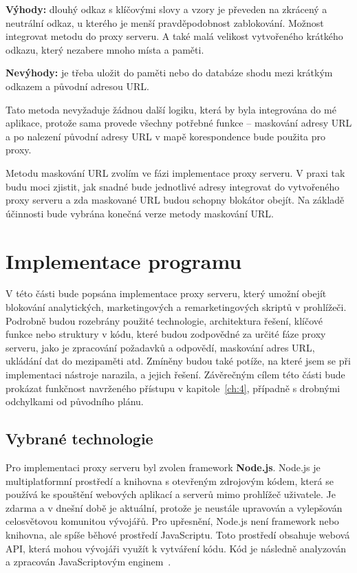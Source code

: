 \textbf{Výhody:} dlouhý odkaz s klíčovými slovy a vzory je převeden na zkrácený a neutrální odkaz, u kterého je menší pravděpodobnost zablokování. Možnost integrovat metodu do proxy serveru. A také malá velikost vytvořeného krátkého odkazu, který nezabere mnoho místa a paměti.

\textbf{Nevýhody:} je třeba uložit do paměti nebo do databáze shodu mezi krátkým odkazem a původní adresou URL.

Tato metoda nevyžaduje žádnou další logiku, která by byla integrována do mé aplikace, protože sama provede všechny potřebné funkce -- maskování adresy URL a po nalezení původní adresy URL v mapě korespondence bude použita pro proxy.
\bigskip

Metodu maskování URL zvolím ve fázi implementace proxy serveru. V praxi tak budu moci zjistit, jak snadné bude jednotlivé adresy integrovat do vytvořeného proxy serveru a zda maskované URL budou schopny blokátor obejít. Na základě účinnosti bude vybrána konečná verze metody maskování URL.



\chapter{Implementace programu}
\label{ch:5}

V této části bude popsána implementace proxy serveru, který umožní obejít blokování analytických, marketingových a remarketingových skriptů v prohlížeči. Podrobně budou rozebrány použité technologie, architektura řešení, klíčové funkce nebo struktury v kódu, které budou zodpovědné za určité fáze proxy serveru, jako je zpracování požadavků a odpovědí, maskování adres URL, ukládání dat do mezipaměti atd. Zmíněny budou také potíže, na které jsem se při implementaci nástroje narazila, a jejich řešení. Závěrečným cílem této části bude prokázat funkčnost navrženého přístupu v kapitole~\ref{ch:4}, případně s drobnými odchylkami od původního plánu.

\section{Vybrané technologie}
Pro implementaci proxy serveru byl zvolen framework \textbf{Node.js}. 
Node.js je multiplatformní prostředí a knihovna s otevřeným zdrojovým kódem, která se používá ke spouštění webových aplikací a serverů mimo prohlížeč uživatele. Je zdarma a v dnešní době je aktuální, protože je neustále upravován a vylepšován celosvětovou komunitou vývojářů. Pro upřesnění, Node.js není framework nebo knihovna, ale spíše běhové prostředí JavaScriptu. Toto prostředí obsahuje webová API, která mohou vývojáři využít k vytváření kódu. Kód je následně analyzován a zpracován JavaScriptovým enginem~\cite{nodejs}.

